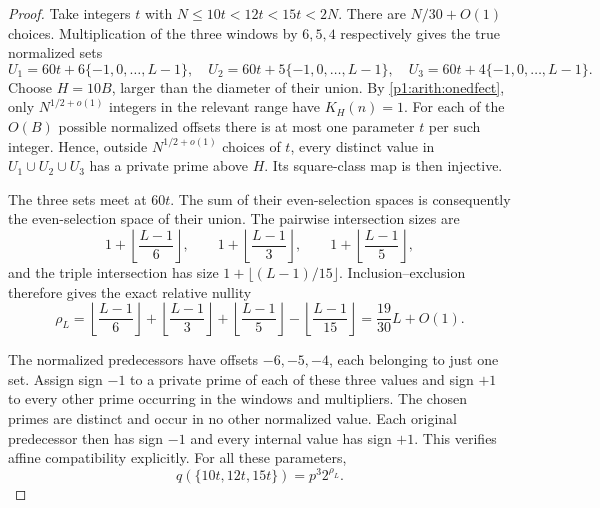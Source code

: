 \begin{proof}
Take integers $t$ with $N\leq10t<12t<15t<2N$.
There are $N/30+O(1)$ choices.  Multiplication of the three windows by
$6,5,4$ respectively gives the true normalized sets
\[
 U_1=60t+6\{-1,0,\ldots,L-1\},\quad
 U_2=60t+5\{-1,0,\ldots,L-1\},\quad
 U_3=60t+4\{-1,0,\ldots,L-1\}.
\]
Choose $H=10B$, larger than the diameter of their union.
By \eqref{p1:arith:onedfect}, only $N^{1/2+o(1)}$ integers in the
relevant range have $K_H(n)=1$.  For each of the $O(B)$ possible
normalized offsets there is at most one parameter $t$ per such integer.
Hence, outside $N^{1/2+o(1)}$ choices of $t$, every distinct value in
$U_1\cup U_2\cup U_3$ has a private prime above $H$.
Its square-class map is then injective.

The three sets meet at $60t$.  The sum of their even-selection spaces
is consequently the even-selection space of their union.
The pairwise intersection sizes are
\[
 1+\left\lfloor\frac{L-1}{6}\right\rfloor,\qquad
 1+\left\lfloor\frac{L-1}{3}\right\rfloor,\qquad
 1+\left\lfloor\frac{L-1}{5}\right\rfloor,
\]
and the triple intersection has size
$1+\lfloor(L-1)/15\rfloor$.
Inclusion--exclusion therefore gives the exact relative nullity
\begin{equation}
 \rho_L=\left\lfloor\frac{L-1}{6}\right\rfloor
        +\left\lfloor\frac{L-1}{3}\right\rfloor
        +\left\lfloor\frac{L-1}{5}\right\rfloor
        -\left\lfloor\frac{L-1}{15}\right\rfloor
       =\frac{19}{30}L+O(1).
 \label{p13:third:witness-nullity}
\end{equation}

The normalized predecessors have offsets $-6,-5,-4$, each belonging
to just one set.  Assign sign $-1$ to a private prime of each of these
three values and sign $+1$ to every other prime occurring in the
windows and multipliers.  The chosen primes are distinct and occur in
no other normalized value.  Each original predecessor then has sign
$-1$ and every internal value has sign $+1$.  This verifies affine
compatibility explicitly.  For all these parameters,
\begin{equation}
 q(\{10t,12t,15t\})=p^3 2^{\rho_L}.
 \label{p13:third:witness-probability}
\end{equation}


\end{proof}
